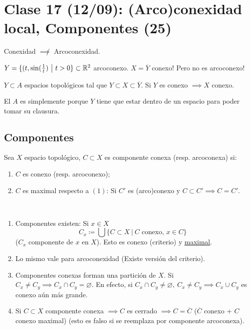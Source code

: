 \section{Clase 17 (12/09): (Arco)conexidad local, Componentes (25)}

\begin{observe}
	Conexidad $\not\implies$ Arcoconexidad.
\end{observe}
\begin{eg}
	$Y = \{(t,\sin(\frac{1}{t}) \ \big| \ t > 0\} \subset \mathbb{R}^2$ arcoconexo. $X = \overline{Y}$ conexo! Pero no es arcoconexo! 
\end{eg}

\begin{lemma}
	$Y \subset A$ espacios topológicos tal que $Y \subset X \subset \overline{Y}$. Si $Y$ es conexo $\implies X$ conexo.
\end{lemma}
\begin{note}
	El $A$ es simplemente porque $Y$ tiene que estar dentro de un espacio para poder tomar su clausura.
\end{note}

\subsection*{Componentes}
\medskip
\begin{definition}
	Sea $X$ espacio topológico, $C \subset X$ es componente conexa (resp. arcoconexa) si:
	\begin{enumerate}
		\item $C$ es conexo (resp. arcoconexo);

		\item $C$ es maximal respecto a $(1)$: Si $C'$ es (arco)conexo y $C \subset C' \implies C = C'$.
	\end{enumerate}
\end{definition}

\begin{observe}~
	\begin{enumerate}
		\item Componentes existen: Si $x \in X$
		\[ C_x \coloneq \bigcup \{C \subset X \ \big| \ C \text{ conexo, } x \in C\} \]
		($C_x$ componente de $x$ en $X$). Esto es conexo (criterio) y \underline{maximal}.

		\item Lo mismo vale para arcoconexidad (Existe versión del criterio).

		\item Componentes conexas forman una partición de $X$. Si $C_x \neq C_y \implies C_x \cap C_y = \varnothing$. En efecto, si $C_x \cap C_y \neq \varnothing,\ C_x \neq C_y \implies C_x \cup C_y$ es conexo aún más grande.

		\item Si $C \subset X$ componente conexa $\implies C$ es cerrado $\implies C = \overline{C}$ ($\overline{C}$ conexo + $C$ conexo maximal) (esto es falso si se reemplaza por componente arcoconexa).
	\end{enumerate}
\end{observe}

